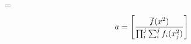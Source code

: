 \footline={} %
\def\frac#1#2{{\begingroup#1\endgroup\over{#2}}}
$$a = \left[ \frac{\overline{f}(x^2)}{\prod_i^j \sum_i^j f_i(x_j^2)} \right]$$
\bye
